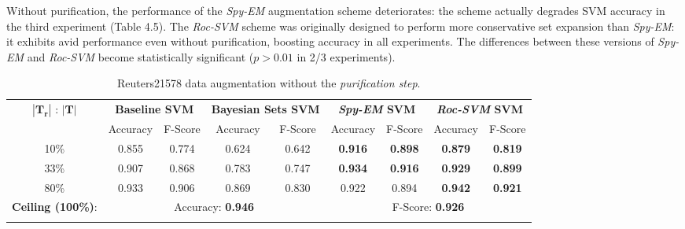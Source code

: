 \documentclass[12pt,twoside,notitlepage,amsart]{report} %
\begin{document}
Without {purification}, the performance of the \emph{Spy-EM} augmentation scheme deteriorates: the scheme actually degrades SVM accuracy in the third experiment (Table 4.5). The \emph{Roc-SVM} scheme was originally designed to perform more conservative set expansion than \emph{Spy-EM}: it exhibits avid performance even without purification, boosting accuracy in all experiments. The differences between these versions of \emph{Spy-EM} and \emph{Roc-SVM} become statistically significant ($p > 0.01$ in 2/3 experiments). %

	\begin{table} 
	
	\begin{center}
	
	\caption{Reuters21578 data augmentation without the \emph{purification step}.}
	
	\begin{adjustbox}{center}
	\renewcommand{\arraystretch}{1.6}
	\begin{tabular}{||c||c c||c c|c c|c c|| }
	
	\hline
	
	\multirow{2}{*}{$|\mathbf{T_r}|$ : $|\mathbf{T}|$ } & \multicolumn{2}{|c||}{\textbf{Baseline SVM}} & \multicolumn{2}{|c|}{\textbf{Bayesian Sets SVM}} & \multicolumn{2}{|c|}{\textbf{\emph{Spy-EM} SVM}} & \multicolumn{2}{|c||}{\textbf{\emph{Roc-SVM} SVM}} \\\cline{2-9}
	
	& Accuracy & F-Score & Accuracy & F-Score & Accuracy & F-Score & Accuracy & F-Score \\
	\hline \hline
	10\% & 0.855 & 0.774  & 0.624	& 0.642 & \textbf{0.916}	& \textbf{0.898} & \textbf{0.879}	& \textbf{0.819} \\ \hline
	33\% & 0.907 & 0.868  & 0.783	& 0.747 & \textbf{0.934}	& \textbf{0.916} & \textbf{0.929}	& \textbf{0.899} \\ \hline 
	80\% & 0.933 & 0.906  & 0.869	& 0.830 & {0.922}	& {0.894} & \textbf{0.942}	& \textbf{0.921}  \\ \hline 
	\hline
	\textbf{\small{Ceiling (100\%)}}: & \multicolumn{4}{|c}{ Accuracy: \textbf{0.946} } & \multicolumn{4}{c|}{F-Score: \textbf{0.926}} \\
	}
	\hline  
	
	\end{tabular}
	\end{adjustbox}
	\end{center}
	\end{table}
	
\end{document}
